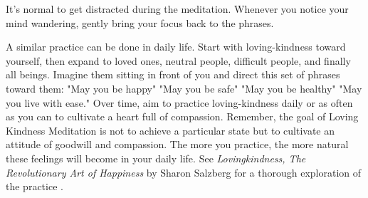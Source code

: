\documentclass[12pt,letterpaper]{article}
\begin{document}
It's normal to get distracted during the meditation. Whenever you notice your mind wandering, gently bring your focus back to the phrases.

A similar practice can be done in daily life. Start with loving-kindness toward yourself, then expand to loved ones, neutral people, difficult people, and finally all beings. Imagine them sitting in front of you and direct this set of phrases toward them: "May you be happy" "May you be safe" "May you be healthy" "May you live with ease."
Over time, aim to practice loving-kindness daily or as often as you can to cultivate a heart full of compassion.
Remember, the goal of Loving Kindness Meditation is not to achieve a particular state but to cultivate an attitude of goodwill and compassion. The more you practice, the more natural these feelings will become in your daily life. See \textit{Lovingkindness, The Revolutionary Art of Happiness} by Sharon Salzberg for a thorough exploration of the practice \cite{salzbergLovingKindness}.
\end{document}
